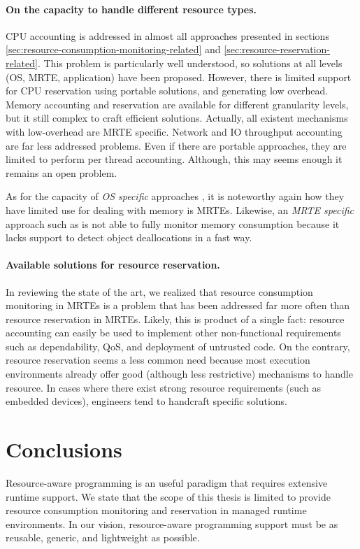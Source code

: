 \paragraph{On the capacity to handle different resource types.}
CPU accounting is addressed in almost all approaches presented in sections \ref{sec:resource-consumption-monitoring-related} and \ref{sec:resource-reservation-related}.
This problem is particularly well understood, so solutions at all levels (OS, MRTE, application) have been proposed.
However, there is limited support for CPU reservation using portable solutions, and generating low overhead.
Memory accounting and reservation are available for different granularity levels, but it still complex to craft efficient solutions.
Actually, all existent mechanisms with low-overhead are MRTE specific.
Network and IO throughput accounting are far less addressed problems.
Even if there are portable approaches, they are limited to perform per thread accounting.
Although, this may seems enough it remains an open problem.

As for the capacity of \textit{OS specific} approaches \cite{Banga:1999:RCN:296806.296810,Kamp00jails:confining, Soltesz:2007:COS:1272998.1273025}, it is noteworthy again how they have limited use for dealing with memory is MRTEs.
Likewise, an \textit{MRTE specific} approach such as \cite{Lengauer:2015:AEO:2668930.2688037} is not able to fully monitor memory consumption because it lacks support to detect object deallocations in a fast way.

\paragraph{Available solutions for resource reservation.}
In reviewing the state of the art, we realized that resource consumption monitoring in MRTEs is a problem that has been addressed far more often than resource reservation in MRTEs.
Likely, this is product of a single fact: resource accounting can easily be used to implement other non-functional requirements such as dependability, QoS, and deployment of untrusted code.
On the contrary, resource reservation seems a less common need because most execution environments already offer good (although less restrictive) mechanisms to handle resource.
In cases where there exist strong resource requirements (such as embedded devices), engineers tend to handcraft specific solutions.


\section{Conclusions}
Resource-aware programming is an useful paradigm that requires extensive runtime support.
We state that the scope of this thesis is limited to provide resource consumption monitoring and reservation in managed runtime environments.
In our vision, resource-aware programming support must be as reusable, generic, and lightweight as possible.

